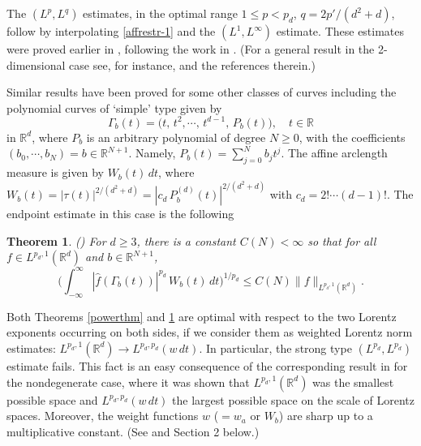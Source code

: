 \documentclass[11 pt]{amsart}
\theoremstyle{plain}
\newtheorem{theorem}{Theorem}[section]
\numberwithin{equation}{section}
\theoremstyle{plain}
\numberwithin{equation}{section}
\theoremstyle{remark}
\begin{document}
The $(L^p, L^q)$ estimates, in the optimal range $1\le p < p_d$, $q=2p'/(d^2+d)$, follow by interpolating \eqref{affrestr-1} and the $(L^1, L^\infty)$ estimate. These estimates were proved earlier in \cite{BOS1}, following the work in \cite{DM2}. (For a general result in the 2-dimensional case see, for instance, \cite{Sj} and the references therein.)

Similar results have been proved for some other classes of curves including the polynomial curves of `simple'
type given by
\begin{equation} \label{polcurve}
\Gamma_b(t)= \Big(t, \, t^2 ,\cdots,\, t^{d-1}
, \,P_b(t)\Big), \quad t\in {{\mathbb {R}}}
\end{equation}
in ${{\mathbb {R}}}^d$, where $P_b$  is an arbitrary polynomial of
degree $N\ge 0$, with the coefficients $(b_0, \cdots, b_N)=b\in
{{\mathbb {R}}}^{N+1}$. Namely,
$ P_b(t) = \sum_{j=0}^N b_j t^j$.
The affine arclength measure is given by $W_b(t) \, dt$,
where
$W_b(t)= |\tau(t)|^{2/(d^2+d)} = |c_d \, P_b^{(d)}(t)|^{2/(d^2+d)}$ with $c_d = 2! \cdots (d-1)!$.
The endpoint estimate in this case is the following
\begin{theorem}{\rm (\cite{BOS3})} \label{polthm}
For $d\ge 3$, there is a constant $C(N)<\infty$ so that for all
$f\in L^{p_d ,1}({{\mathbb {R}}}^d)$ and $b\in {{\mathbb {R}}}^{N+1}$,
\begin{equation} \label{affrestr-2}
\Big(\int_{-\infty}^\infty
 |\widehat f (\Gamma_b(t))|^{p_d} \, W_b(t) \, dt\Big)^{1/p_d} \le
C(N)\|f\|_{L^{p_d ,1}({{\mathbb {R}}}^d)}.
\end{equation}
\end{theorem}
Both Theorems \ref{powerthm} and \ref{polthm} are optimal with respect to the two Lorentz exponents occurring on both sides, if we consider them as weighted Lorentz norm estimates: $L^{p_d,1}({{\mathbb {R}}}^d) \to L^{p_d, p_d} (w \, dt)$. In particular, the strong type $(L^{p_d}, L^{p_d})$ estimate fails.
This fact is an easy consequence of the corresponding result in \cite{BOS1} for the nondegenerate case, where it was shown that $L^{p_d,1}({{\mathbb {R}}}^d)$ was the smallest possible space and $L^{p_d,p_d}(w \, dt)$ the largest possible space on the scale of Lorentz spaces.
Moreover, the weight functions $w$ ($=w_a$ or $W_b$) are sharp up to a multiplicative constant. (See \cite{BOS3, Obaff} and Section 2 below.)

\medskip
\end{document}
